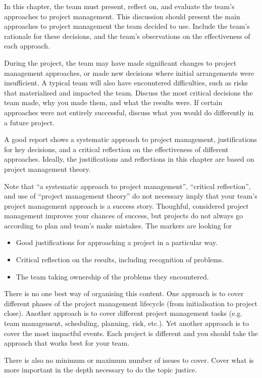 \begin{expectations}
In this chapter, the team must present, reflect on, and evaluate the team's approaches to project management.  This discussion should present the main approaches to project management the team decided to use.  Include the team's rationale for these decisions, and the team's observations on the effectiveness of each approach.

During the project, the team may have made significant changes to project management approaches, or made new decisions where initial arrangements were insufficient.  A typical team will also have encountered difficulties, such as risks that materialised and impacted the team.  Discuss the most critical decisions the team made, why you made them, and what the results were.  If certain approaches were not entirely successful, discuss what you would do differently in a future project.  

A good report shows a systematic approach to project management, justifications for key decisions, and a critical reflection on the effectiveness of different approaches.  Ideally, the justifications and reflections in this chapter are based on project management theory.

Note that ``a systematic approach to project management'', ``critical reflection'', and use of ``project management theory'' do not necessary imply that your team's project management approach is a success story.  Thoughful, considered project management improves your chances of success, but projects do not always go according to plan and team's make mistakes.  The markers are looking for 
\begin{itemize}
    \item Good justifications for approaching a project in a particular way.
    \item Critical reflection on the results, including recognition of problems.
    \item The team taking ownership of the problems they encountered.
\end{itemize}

There is no one best way of organising this content.  One approach is to cover different phases of the project management lifecycle (from initialisation to project close).  Another approach is to cover different project management tasks (e.g. team management, scheduling, planning, risk, etc.).  Yet another approach is to cover the most impactful events.  Each project is different and you should take the approach that works best for your team.

There is also no minimum or maximum number of issues to cover.  Cover what is more important in the depth necessary to do the topic justice.
\end{expectations}

